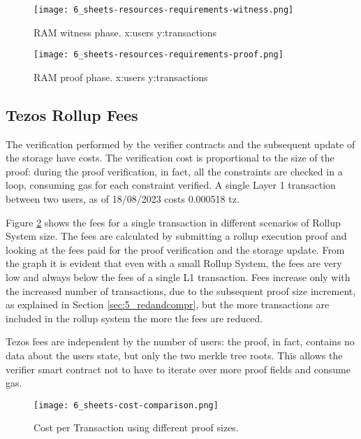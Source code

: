 \begin{figure}
	\centering
	\begin{minipage}{.5\textwidth}
		\centering
		\texttt{[image: 6\_sheets-resources-requirements-witness.png]}
		\caption[RAM Compile]{RAM witness phase. \newline x:users y:transactions}
		\label{fig:6_sheets-resources-requirements-witness.png}
	\end{minipage}%
	\begin{minipage}{.5\textwidth}
		\centering
		\texttt{[image: 6\_sheets-resources-requirements-proof.png]}
		\caption[RAM Proof]{RAM proof phase. \newline x:users y:transactions}
		\label{fig:6_sheets-resources-requirements-proof.png}
	\end{minipage}
\end{figure}

\subsection{Tezos Rollup Fees}

The verification performed by the verifier contracts and the subsequent update of the storage have costs. The verification cost is proportional to the size of the proof: during the proof verification, in fact, all the constraints are checked in a loop, consuming gas for each constraint verified. A single Layer 1 transaction between two users, as of 18/08/2023 costs 0.000518 tz.

Figure \ref{fig:6_sheets-cost-comparison.png} shows the fees for a single transaction in different scenarios of Rollup System size. The fees are calculated by submitting a rollup execution proof and looking at the fees paid for the proof verification and the storage update. From the graph it is evident that even with a small Rollup System, the fees are very low and always below the fees of a single L1 transaction. Fees increase only with the increased number of transactions, due to the subsequent proof size increment, as explained in Section \ref{sec:5_redandcompr}, but the more transactions are included in the rollup system the more the fees are reduced.

Tezos fees are independent by the number of users: the proof, in fact, contains no data about the users state, but only the two merkle tree roots. This allows the verifier smart contract not to have to iterate over more proof fields and consume gas.

\begin{figure}[ht]
	\centering
	\texttt{[image: 6\_sheets-cost-comparison.png]}
	\caption[Cost Comparison]{Cost per Transaction using different proof sizes.}
	\label{fig:6_sheets-cost-comparison.png}
\end{figure}

